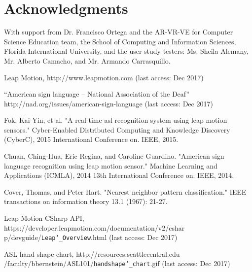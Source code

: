 \documentclass[letterpaper, 10 pt, conference]{ieeeconf}
\begin{document}
\section*{Acknowledgments}

With support from Dr. Francisco Ortega and the AR-VR-VE for Computer Science Education team, the School of Computing and Information Sciences, Florida International University, and the user study testers: Ms. Sheila Alemany, Mr. Alberto Camacho, and Mr. Armando Carrasquillo.



\begin{thebibliography}{}
\normalsize

 Leap Motion, http://www.leapmotion.com (last access: Dec 2017)

 “American sign language – National Association of the Deaf” http://nad.org/issues/american-sign-language (last access: Dec 2017)

 Fok, Kai-Yin, et al. "A real-time asl recognition system using leap motion sensors." Cyber-Enabled Distributed Computing and Knowledge Discovery (CyberC), 2015 International Conference on. IEEE, 2015.

 Chuan, Ching-Hua, Eric Regina, and Caroline Guardino. "American sign language recognition using leap motion sensor." Machine Learning and Applications (ICMLA), 2014 13th International Conference on. IEEE, 2014.

 Cover, Thomas, and Peter Hart. "Nearest neighbor pattern classification." IEEE transactions on information theory 13.1 (1967): 21-27.

 Leap Motion CSharp API, https://developer.leapmotion.com/documentation/v2/cshar
p/devguide/\texttt{Leap\char`_Overview}.html (last access: Dec 2017)

 ASL hand-shape chart, http://resources.seattlecentral.edu
/faculty/bbernstein/ASL101/\texttt{handshape\char`_chart}.gif (last access: Dec 2017)



\end{thebibliography}

\end{document}
